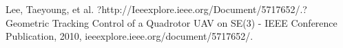 \documentclass[letterpaper, 10 pt, conference]{ieeeconf}  %
\begin{document}









\begin{thebibliography}{99}

 Lee, Taeyoung, et al. ?http://Ieeexplore.ieee.org/Document/5717652/.? Geometric Tracking Control of a Quadrotor UAV on SE(3) - IEEE Conference Publication, 2010, ieeexplore.ieee.org/document/5717652/. 



\end{thebibliography}
\end{document}
